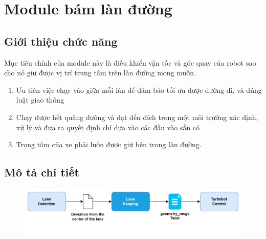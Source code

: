 
\section{Module bám làn đường}

\subsection{Giới thiệu chức năng}

Mục tiêu chính của module này là điều khiển vận tốc và góc quay của robot sao cho nó giữ được vị trí trung tâm trên làn đường mong muốn.
\begin{enumerate}
    \item Ưu tiên việc chạy vào giữa mỗi làn để đảm bảo tối ưu được đường đi, và đúng luật giao thông
    \item Chạy được hết quãng đường và đạt đến đích trong một môi trường xác định, xử lý và đưa ra quyết định chỉ dựa vào các đầu vào sẵn có
    \item Trọng tâm của xe phải luôn được giữ bên trong làn đường.
\end{enumerate}
\subsection{Mô tả chi tiết}
\begin{figure}[htp]
    \centering
    \includegraphics[width=\linewidth]{img/3_Architecture/lane_keeping_structure.png}
\end{figure}


